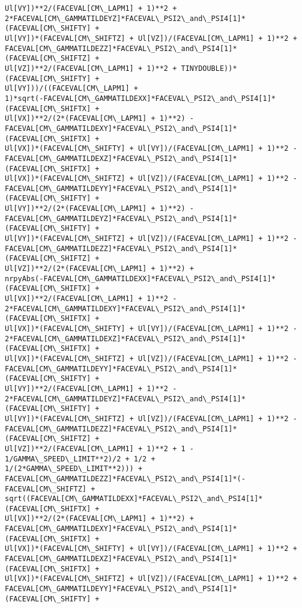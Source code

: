 \documentclass[landscape,letterpaper,10pt,english]{article}
\begin{document}
\begin{Verbatim}[commandchars=\\\{\}]
Ul[VY])**2/(FACEVAL[CM\_LAPM1] + 1)**2 +
2*FACEVAL[CM\_GAMMATILDEYZ]*FACEVAL\_PSI2\_and\_PSI4[1]*(FACEVAL[CM\_SHIFTY] +
Ul[VY])*(FACEVAL[CM\_SHIFTZ] + Ul[VZ])/(FACEVAL[CM\_LAPM1] + 1)**2 +
FACEVAL[CM\_GAMMATILDEZZ]*FACEVAL\_PSI2\_and\_PSI4[1]*(FACEVAL[CM\_SHIFTZ] +
Ul[VZ])**2/(FACEVAL[CM\_LAPM1] + 1)**2 + TINYDOUBLE))*(FACEVAL[CM\_SHIFTY] +
Ul[VY]))/((FACEVAL[CM\_LAPM1] +
1)*sqrt(-FACEVAL[CM\_GAMMATILDEXX]*FACEVAL\_PSI2\_and\_PSI4[1]*(FACEVAL[CM\_SHIFTX] +
Ul[VX])**2/(2*(FACEVAL[CM\_LAPM1] + 1)**2) -
FACEVAL[CM\_GAMMATILDEXY]*FACEVAL\_PSI2\_and\_PSI4[1]*(FACEVAL[CM\_SHIFTX] +
Ul[VX])*(FACEVAL[CM\_SHIFTY] + Ul[VY])/(FACEVAL[CM\_LAPM1] + 1)**2 -
FACEVAL[CM\_GAMMATILDEXZ]*FACEVAL\_PSI2\_and\_PSI4[1]*(FACEVAL[CM\_SHIFTX] +
Ul[VX])*(FACEVAL[CM\_SHIFTZ] + Ul[VZ])/(FACEVAL[CM\_LAPM1] + 1)**2 -
FACEVAL[CM\_GAMMATILDEYY]*FACEVAL\_PSI2\_and\_PSI4[1]*(FACEVAL[CM\_SHIFTY] +
Ul[VY])**2/(2*(FACEVAL[CM\_LAPM1] + 1)**2) -
FACEVAL[CM\_GAMMATILDEYZ]*FACEVAL\_PSI2\_and\_PSI4[1]*(FACEVAL[CM\_SHIFTY] +
Ul[VY])*(FACEVAL[CM\_SHIFTZ] + Ul[VZ])/(FACEVAL[CM\_LAPM1] + 1)**2 -
FACEVAL[CM\_GAMMATILDEZZ]*FACEVAL\_PSI2\_and\_PSI4[1]*(FACEVAL[CM\_SHIFTZ] +
Ul[VZ])**2/(2*(FACEVAL[CM\_LAPM1] + 1)**2) +
nrpyAbs(-FACEVAL[CM\_GAMMATILDEXX]*FACEVAL\_PSI2\_and\_PSI4[1]*(FACEVAL[CM\_SHIFTX] +
Ul[VX])**2/(FACEVAL[CM\_LAPM1] + 1)**2 -
2*FACEVAL[CM\_GAMMATILDEXY]*FACEVAL\_PSI2\_and\_PSI4[1]*(FACEVAL[CM\_SHIFTX] +
Ul[VX])*(FACEVAL[CM\_SHIFTY] + Ul[VY])/(FACEVAL[CM\_LAPM1] + 1)**2 -
2*FACEVAL[CM\_GAMMATILDEXZ]*FACEVAL\_PSI2\_and\_PSI4[1]*(FACEVAL[CM\_SHIFTX] +
Ul[VX])*(FACEVAL[CM\_SHIFTZ] + Ul[VZ])/(FACEVAL[CM\_LAPM1] + 1)**2 -
FACEVAL[CM\_GAMMATILDEYY]*FACEVAL\_PSI2\_and\_PSI4[1]*(FACEVAL[CM\_SHIFTY] +
Ul[VY])**2/(FACEVAL[CM\_LAPM1] + 1)**2 -
2*FACEVAL[CM\_GAMMATILDEYZ]*FACEVAL\_PSI2\_and\_PSI4[1]*(FACEVAL[CM\_SHIFTY] +
Ul[VY])*(FACEVAL[CM\_SHIFTZ] + Ul[VZ])/(FACEVAL[CM\_LAPM1] + 1)**2 -
FACEVAL[CM\_GAMMATILDEZZ]*FACEVAL\_PSI2\_and\_PSI4[1]*(FACEVAL[CM\_SHIFTZ] +
Ul[VZ])**2/(FACEVAL[CM\_LAPM1] + 1)**2 + 1 - 1/GAMMA\_SPEED\_LIMIT**2)/2 + 1/2 +
1/(2*GAMMA\_SPEED\_LIMIT**2))) +
FACEVAL[CM\_GAMMATILDEZZ]*FACEVAL\_PSI2\_and\_PSI4[1]*(-FACEVAL[CM\_SHIFTZ] +
sqrt((FACEVAL[CM\_GAMMATILDEXX]*FACEVAL\_PSI2\_and\_PSI4[1]*(FACEVAL[CM\_SHIFTX] +
Ul[VX])**2/(2*(FACEVAL[CM\_LAPM1] + 1)**2) +
FACEVAL[CM\_GAMMATILDEXY]*FACEVAL\_PSI2\_and\_PSI4[1]*(FACEVAL[CM\_SHIFTX] +
Ul[VX])*(FACEVAL[CM\_SHIFTY] + Ul[VY])/(FACEVAL[CM\_LAPM1] + 1)**2 +
FACEVAL[CM\_GAMMATILDEXZ]*FACEVAL\_PSI2\_and\_PSI4[1]*(FACEVAL[CM\_SHIFTX] +
Ul[VX])*(FACEVAL[CM\_SHIFTZ] + Ul[VZ])/(FACEVAL[CM\_LAPM1] + 1)**2 +
FACEVAL[CM\_GAMMATILDEYY]*FACEVAL\_PSI2\_and\_PSI4[1]*(FACEVAL[CM\_SHIFTY] +

\end{Verbatim}
\end{document}
